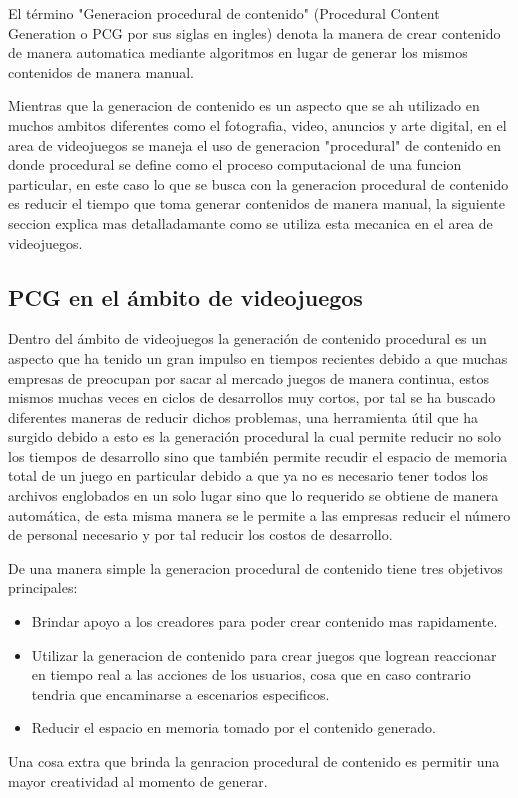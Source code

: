El término "Generacion procedural de contenido" (Procedural Content Generation o
PCG por sus siglas en ingles) denota la manera de crear contenido de manera
automatica mediante algoritmos en lugar de generar los mismos contenidos de
manera manual.

Mientras que la generacion de contenido es un aspecto que se ah utilizado en
muchos ambitos diferentes como el fotografia, video, anuncios y arte digital, en
el area de videojuegos se maneja el uso de generacion "procedural" de contenido
en donde procedural se define como el proceso computacional de una funcion
particular, en este caso lo que se busca con la generacion procedural de
contenido es reducir el tiempo que toma generar contenidos de manera manual, la
siguiente seccion explica mas detalladamante como se utiliza esta mecanica en el
area de videojuegos.

\subsection{PCG en el ámbito de videojuegos}
\label{subsection:PCGInGames}

Dentro del ámbito de videojuegos la generación de contenido procedural es un
aspecto que ha tenido un gran impulso en tiempos recientes debido a que muchas
empresas de preocupan por sacar al mercado juegos de manera continua, estos
mismos muchas veces en ciclos de desarrollos muy cortos, por tal se ha buscado
diferentes maneras de reducir dichos problemas, una herramienta útil que ha
surgido debido a esto es la generación procedural la cual permite reducir no
solo los tiempos de desarrollo sino que también permite recudir el espacio de
memoria total de un juego en particular debido a que ya no es necesario tener
todos los archivos englobados en un solo lugar sino que lo requerido se obtiene
de manera automática, de esta misma manera se le permite a las empresas reducir
el número de personal necesario y por tal reducir los costos de desarrollo.

De una manera simple la generacion procedural de contenido tiene tres objetivos
principales:
\begin{itemize}
    \item Brindar apoyo a los creadores para poder crear contenido mas
    rapidamente.
    \item Utilizar la generacion de contenido para crear juegos que logrean
    reaccionar en tiempo real a las acciones de los usuarios, cosa que en caso
    contrario tendria que encaminarse a escenarios especificos.
    \item Reducir el espacio en memoria tomado por el contenido generado.
\end{itemize}
Una cosa extra que brinda la genracion procedural de contenido es permitir una
mayor creatividad al momento de generar.

